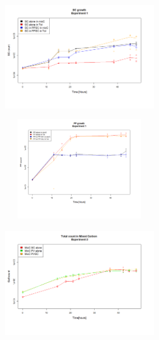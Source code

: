 \documentclass[a4paper, 10pt, conference]{ieeeconf}   %
\begin{document}
\begin{landscape}
\begin{figure}
\begin{subfigure}{.35\textheight}
			\vspace{-0.1cm}
			\includegraphics[width=6.5cm]{SCgrowth1.png}
			\caption{}
			\label{SCgrowth1}
		\end{subfigure}%
		\begin{subfigure}{.35\textheight}
			\centering
			\vspace{0cm}
			\includegraphics[width=6.5cm, height=4.3cm]{PPgrowth1.png}
			\caption{}
			\label{PPgrowth1}
		\end{subfigure}	
		\begin{subfigure}{.35\textheight}
			\centering
			
			\includegraphics[width=6.5cm, height=4.65cm]{totcount_mixC2.png}
			\caption{}
			\label{totcountmixC2}
		\end{subfigure}%
		\begin{subfigure}{.35\textheight}
			\centering
			

\end{subfigure}
\end{figure}
\end{landscape}
\end{document}
